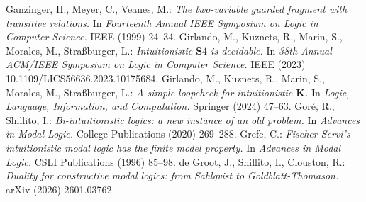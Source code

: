 \documentclass[draft]{article}
\def\K{\mathbf{K}}
\def\S{\mathbf{S}}
\begin{document}
\begin{thebibliography}{}
%
%
Ganzinger, H., Meyer, C., Veanes, M.:
{\it The two-variable guarded fragment with transitive relations.}
In {\it Fourteenth Annual IEEE Symposium on Logic in Computer Science.}
IEEE (1999) 24--34.
%
%
%
%
%
%
%
%
%
%
Girlando, M., Kuznets, R., Marin, S., Morales, M., Stra\ss burger, L.:
{\it Intuitionistic $\S4$ is decidable.}
In {\it 38th Annual ACM/IEEE Symposium on Logic in Computer Science.}
IEEE (2023) 10.1109/LICS56636.2023.10175684.
%
%
Girlando, M., Kuznets, R., Marin, S., Morales, M., Stra\ss burger, L.:
{\it A simple loopcheck for intuitionistic $\K$.}
In {\it Logic, Language, Information, and Computation.}
Springer (2024) 47--63.
%
%
Gor\'e, R., Shillito, I.:
{\it Bi-intuitionistic logics: a new instance of an old problem.}
In {\it Advances in Modal Logic.}
College Publications (2020) 269--288.
%
%
Grefe, C.:
{\it Fischer Servi's intuitionistic modal logic has the finite model property.}
In {\it Advances in Modal Logic.}
CSLI Publications (1996) 85--98.
%
%
%
%
de Groot, J., Shillito, I., Clouston, R.:
{\it Duality for constructive modal logics: from Sahlqvist to Goldblatt-Thomason.}
arXiv (2026) 2601.03762.
%
%
%
%

\end{thebibliography}
\end{document}
